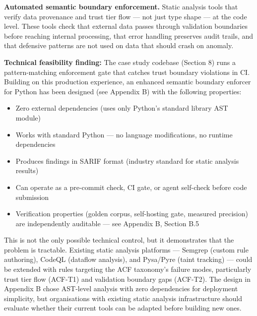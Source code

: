 \documentclass[a4paper,11pt]{report}
\providecommand{\tightlist}{%
  \setlength{\itemsep}{0pt}\setlength{\parskip}{0pt}}
\begin{document}
\textbf{Automated semantic boundary enforcement.} Static analysis tools
that verify data provenance and trust tier flow --- not just type shape
--- at the code level. These tools check that external data passes
through validation boundaries before reaching internal processing, that
error handling preserves audit trails, and that defensive patterns are
not used on data that should crash on anomaly.

\textbf{Technical feasibility finding:} The case study codebase (Section
8) runs a pattern-matching enforcement gate that catches trust boundary
violations in CI. Building on this production experience, an enhanced
semantic boundary enforcer for Python has been designed (see Appendix B)
with the following properties:

\begin{itemize}
\tightlist
\item
  Zero external dependencies (uses only Python's standard library AST
  module)
\item
  Works with standard Python --- no language modifications, no runtime
  dependencies
\item
  Produces findings in SARIF format (industry standard for static
  analysis results)
\item
  Can operate as a pre-commit check, CI gate, or agent self-check before
  code submission
\item
  Verification properties (golden corpus, self-hosting gate, measured
  precision) are independently auditable --- see Appendix B, Section B.5
\end{itemize}

This is not the only possible technical control, but it demonstrates
that the problem is tractable. Existing static analysis platforms ---
Semgrep (custom rule authoring), CodeQL (dataflow analysis), and
Pysa/Pyre (taint tracking) --- could be extended with rules targeting
the ACF taxonomy's failure modes, particularly trust tier flow (ACF-T1)
and validation boundary gaps (ACF-T2). The design in Appendix B chose
AST-level analysis with zero dependencies for deployment simplicity, but
organisations with existing static analysis infrastructure should
evaluate whether their current tools can be adapted before building new
ones.
\end{document}
